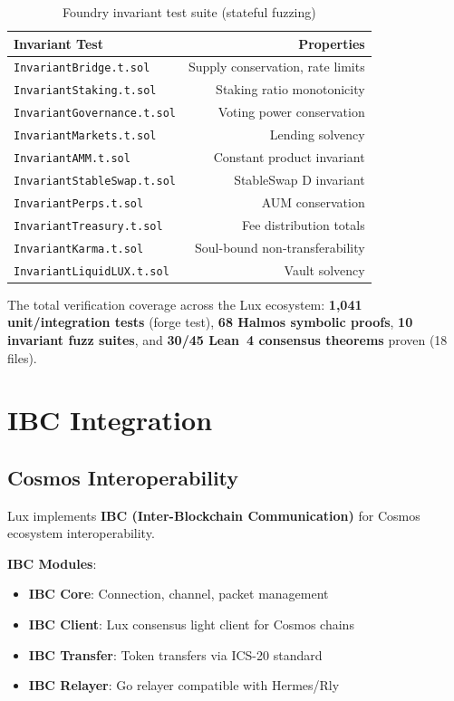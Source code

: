 \documentclass[11pt]{article}
\begin{document}
\begin{table}[h]
\centering
\begin{tabular}{lr}
\toprule
\textbf{Invariant Test} & \textbf{Properties} \\
\midrule
\texttt{InvariantBridge.t.sol} & Supply conservation, rate limits \\
\texttt{InvariantStaking.t.sol} & Staking ratio monotonicity \\
\texttt{InvariantGovernance.t.sol} & Voting power conservation \\
\texttt{InvariantMarkets.t.sol} & Lending solvency \\
\texttt{InvariantAMM.t.sol} & Constant product invariant \\
\texttt{InvariantStableSwap.t.sol} & StableSwap D invariant \\
\texttt{InvariantPerps.t.sol} & AUM conservation \\
\texttt{InvariantTreasury.t.sol} & Fee distribution totals \\
\texttt{InvariantKarma.t.sol} & Soul-bound non-transferability \\
\texttt{InvariantLiquidLUX.t.sol} & Vault solvency \\
\bottomrule
\end{tabular}
\caption{Foundry invariant test suite (stateful fuzzing)}
\end{table}

The total verification coverage across the Lux ecosystem: \textbf{1,041 unit/integration tests} (forge test), \textbf{68 Halmos symbolic proofs}, \textbf{10 invariant fuzz suites}, and \textbf{30/45 Lean~4 consensus theorems} proven (18 files).

\section{IBC Integration}

\subsection{Cosmos Interoperability}

Lux implements \textbf{IBC (Inter-Blockchain Communication)} for Cosmos ecosystem interoperability.

\textbf{IBC Modules}:
\begin{itemize}[leftmargin=1.1em]
  \item \textbf{IBC Core}: Connection, channel, packet management
  \item \textbf{IBC Client}: Lux consensus light client for Cosmos chains
  \item \textbf{IBC Transfer}: Token transfers via ICS-20 standard
  \item \textbf{IBC Relayer}: Go relayer compatible with Hermes/Rly
\end{itemize}
\end{document}
